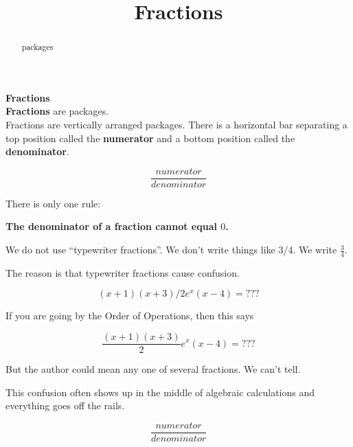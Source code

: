 \documentclass{ximera}
\title{Fractions}
\begin{document}
\begin{abstract}
packages
\end{abstract}
\maketitle



\begin{definition}  \textbf{\textcolor{green!50!black}{Fractions}} \\


\textbf{Fractions} are packages. \\


Fractions are vertically arranged packages.  There is a horizontal bar separating a top position called the \textbf{numerator} and a bottom position called the \textbf{denominator}.



\[
\frac{numerator}{denominator}
\]


There is only one rule:

\begin{center}
\textbf{\textcolor{red!70!black}{The denominator of a fraction cannot equal $0$.}}
\end{center}


\end{definition}






\begin{warning}

We do not use ``typewriter fractions''.  We don't write things like 3/4.  We write $\frac{3}{4}$.


The reason is that typewriter fractions cause confusion.

\[
(x+1)(x+3)/2 e^x (x-4) = ???
\]


If you are going by the Order of Operations, then this says


\[
\frac{(x+1)(x+3)}{2} e^x (x-4) = ???
\]


But the author could mean any one of several fractions.  We can't tell.


This confusion often shows up in the middle of algebraic calculations and everything goes off the rails.




\[
\frac{numerator}{denominator}
\]


\end{warning}
\end{document}
